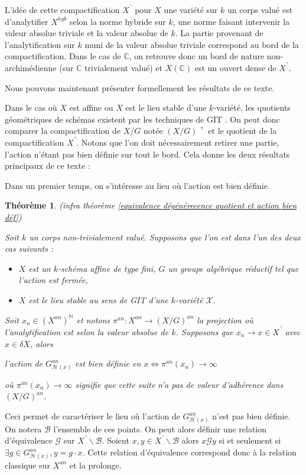 \documentclass[11pt]{article}
\newcommand{\N}{\mathbb{N}}
\newcommand{\C}{\mathbb{C}}
\newcommand{\h}{\mathcal{H}}
\newtheorem{thm}{Théorème}[section]
\begin{document}
L'idée de cette compactification $X^\urcorner$ pour $X$ une variété sur $k$ un corps valué est d'analytifier $X^{hyb}$ selon la norme hybride sur $k$, une norme faisant intervenir  la valeur absolue triviale et la valeur absolue de $k$. La partie provenant de l'analytification sur $k$ muni de la valeur absolue triviale correspond au bord de la compactification. Dans le cas de $\C$, on retrouve donc un bord de nature non-archimédienne (sur $\C$ trivialement valué) et $X(\C)$ est un ouvert dense de $X^\urcorner$.

\bigskip

Nous pouvons maintenant présenter formellement les résultats de ce texte.

Dans le cas où $X$ est affine ou $X$ est le lieu stable d'une $k$-variété, les quotients géométriques de schémas existent par les techniques de GIT \cite{GIT}. On peut donc comparer la compactification de $X/G$ notée $(X/G)\urcorner$ et le quotient de la compactification $X^\urcorner$. Notons que l'on doit nécessairement retirer une partie, l'action n'étant pas bien définie sur tout le bord. Cela donne les deux résultats principaux de ce texte :

Dans un premier temps, on s'intéresse au lieu où l'action est bien définie. 

\begin{thm}(infra théorème \ref{equivalence dégénérecence quotient et action bien déf})

Soit $k$ un corps non-trivialement valué. Supposons que l'on est dans l'un des deux cas suivants :
\begin{itemize}
\item $X$ est un $k$-schéma affine de type fini, $G$ un groupe algébrique réductif tel que l'action est fermée,
\item $X$ est le lieu stable au sens de GIT d'une $k$-variété $\mathcal{X}$.
\end{itemize}


Soit $x_n \in (X^{an})^\N$ et notons $\pi^{an} : X^{an} \rightarrow (X/G)^{an}$ la projection où l'analytification est selon la valeur absolue de $k$. Supposons que $x_n \rightarrow x \in X^\urcorner$ avec $x\in \delta X$, alors
\begin{center}
l'action de $G_{\mathcal{H}(x)}^{an}$ est bien définie en $x \iff \pi^{an}(x_n) \rightarrow \infty$
\end{center} 
où $\pi^{an}(x_n) \rightarrow \infty$ signifie que cette suite n'a pas de valeur d'adhérence dans $(X/G)^{an}$.
\end{thm}
Ceci permet de caractériser le lieu où l'action de $G^{an}_{\h(x)}$ n'est pas bien définie. On notera $\mathcal{B}$ l'ensemble de ces points. On peut alors définir une relation d'équivalence $\mathcal{G}$ sur $X^\urcorner \backslash \mathcal{B}$. Soient $x, y\in X^\urcorner \backslash \mathcal{B}$ alors $x \mathcal{G} y$ si et seulement si $\exists g\in G^{an}_{\h(x)}, y = g\cdot x$. Cette relation d'équivalence correspond donc à la relation classique sur $X^{an}$ et la prolonge.
\end{document}

